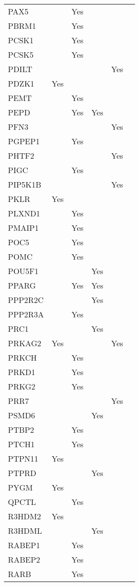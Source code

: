 \documentclass[]{report}
\begin{document}
\begin{longtable}[t]{llllll}
PAX5 &  & Yes &  &  & \\
PBRM1 &  & Yes &  &  & \\
PCSK1 &  & Yes &  &  & \\
PCSK5 &  & Yes &  &  & \\
PDILT &  &  &  & Yes & \\
PDZK1 & Yes &  &  &  & \\
PEMT &  & Yes &  &  & \\
PEPD &  & Yes & Yes &  & \\
PFN3 &  &  &  & Yes & \\
PGPEP1 &  & Yes &  &  & \\
PHTF2 &  &  &  & Yes & \\
PIGC &  & Yes &  &  & \\
PIP5K1B &  &  &  & Yes & \\
PKLR & Yes &  &  &  & \\
PLXND1 &  & Yes &  &  & \\
PMAIP1 &  & Yes &  &  & \\
POC5 &  & Yes &  &  & \\
POMC &  & Yes &  &  & \\
POU5F1 &  &  & Yes &  & \\
PPARG &  & Yes & Yes &  & \\
PPP2R2C &  &  & Yes &  & \\
PPP2R3A &  & Yes &  &  & \\
PRC1 &  &  & Yes &  & \\
PRKAG2 & Yes &  &  & Yes & \\
PRKCH &  & Yes &  &  & \\
PRKD1 &  & Yes &  &  & \\
PRKG2 &  & Yes &  &  & \\
PRR7 &  &  &  & Yes & \\
PSMD6 &  &  & Yes &  & \\
PTBP2 &  & Yes &  &  & \\
PTCH1 &  & Yes &  &  & \\
PTPN11 & Yes &  &  &  & \\
PTPRD &  &  & Yes &  & \\
PYGM & Yes &  &  &  & \\
QPCTL &  & Yes &  &  & \\
R3HDM2 & Yes &  &  &  & \\
R3HDML &  &  & Yes &  & \\
RABEP1 &  & Yes &  &  & \\
RABEP2 &  & Yes &  &  & \\
RARB &  & Yes &  &  & \\

\end{longtable}
\end{document}
